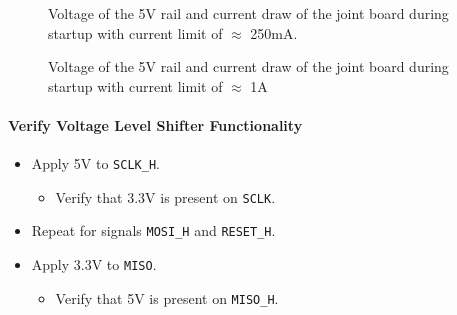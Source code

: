 \begin{figure}[h]
	\centering
	
	\caption[Voltages and current of 5V converter with current limit]{Voltage of the 5V rail and current draw of the joint board during startup with current limit of $\approx$ 250mA.}
	\label{fig:joint_curr_limit}
\end{figure}

\begin{figure}[h]
	\centering
	
	\caption[Voltages and current of 5V converter without current limit.]{Voltage of the 5V rail and current draw of the joint board during startup with current limit of $\approx$ 1A}
	\label{fig:joint_no_curr_limit}
\end{figure}

\paragraph{Verify Voltage Level Shifter Functionality} %
\label{par:verify_voltage_level_shifter_functionality}
\begin{itemize}
	\item Apply 5V to \texttt{SCLK\_H}.
	\begin{itemize}
		\item[\cmark]  Verify that 3.3V is present on \texttt{SCLK}.
	\end{itemize}
	\item Repeat for signals \texttt{MOSI\_H} and \texttt{RESET\_H}.
	\item Apply 3.3V to \texttt{MISO}.
	\begin{itemize}
		\item[\cmark]  Verify that 5V is present on \texttt{MISO\_H}.
	\end{itemize}
\end{itemize}

